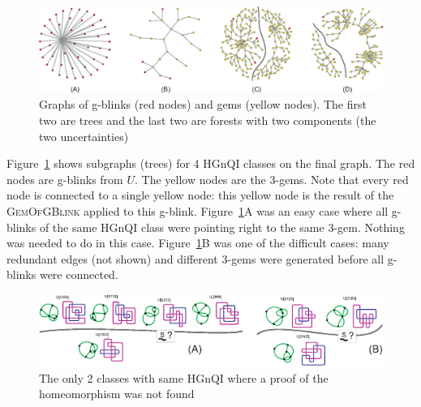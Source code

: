 \begin{figure}[htp]
   \begin{center}
      \leavevmode
      \includegraphics[width=15cm]{fig/subgraphs.eps}
   \end{center}
   \vspace{-0.7cm}
   \caption{Graphs of g-blinks (red nodes) and gems (yellow nodes). The first two are trees
   and the last two are forests with two components (the two uncertainties)}
   \label{fig:subgraphs}
\end{figure}

Figure~\ref{fig:subgraphs} shows subgraphs (trees) for 4 HGnQI
classes on the final graph. The red nodes are g-blinks from $U$. The
yellow nodes are the 3-gems. Note that every red node is connected
to a single yellow node: this yellow node is the result of the
\textsc{GemOfGBlink} applied to this g-blink.
Figure~\ref{fig:subgraphs}A was an easy case where all g-blinks
of the same HGnQI class were pointing right to the same 3-gem.
Nothing was needed to do in this case. Figure~\ref{fig:subgraphs}B
was one of the difficult cases: many redundant edges (not shown) and
different 3-gems were generated before all g-blinks were connected.
\begin{figure}[htp]
   \begin{center}
      \leavevmode
      \includegraphics[width=16cm]{fig/doubts.eps}
   \end{center}
   \vspace{-0.7cm}
   \caption{ The only 2 classes with same HGnQI where a proof of the homeomorphism was not found}
   \label{fig:doubts}
\end{figure}

